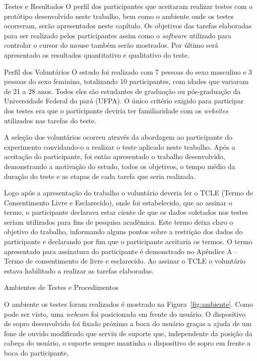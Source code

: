 \begin{chapter}{Testes e Resultados}
O perfil dos participantes que aceitaram realizar testes com o protótipo
desenvolvido neste trabalho, bem como o ambiente onde os testes ocorreram, serão
apresentados neste capítulo. Os objetivos das tarefas elaboradas para ser
realizado pelos participantes assim como o \textit{software} utilizado  para
controlar o cursor do mouse também serão mostrados. Por último será apresentado
os resultados quantitativo e qualitativo do teste.  

\begin{section}{Perfil dos Voluntários}
O estudo foi realizado com 7 pessoas do sexo masculino e 3 pessoas do sexo
feminino, totalizando 10 participantes, com idades que variaram de 21 a 28 anos.
Todos eles são estudantes de graduação ou pós-graduação da Universidade Federal
do pará (UFPA). O único critério exigido para participar dos testes era que o
participante deviria ter familiaridade com os \textit{websites} utilizados nas
tarefas do teste.  

A seleção dos voluntários ocorreu através da abordagem ao participante do
experimento convidando-o a realizar o teste aplicado neste trabalho. Após a
aceitação do participante, foi então apresentado o trabalho desenvolvido,
demonstrando a motivação do estudo, todos os objetivos, o tempo médio da duração
do teste e  as etapas de cada tarefa que seria realizada. 

Logo após a apresentação do trabalho o voluntário deveria ler o TCLE (Termo de
Consentimento Livre e Esclarecido), onde foi estabelecido, que ao assinar o
termo, o participante declarava estar ciente de que os dados coletados nos
testes seriam utilizados para fins de pesquisa acadêmica. Este termo deixa
claro o objetivo do trabalho, informando alguns pontos sobre a restrição dos
dados do participante e declarando por fim que o participante aceitaria os
termos. O termo apresentado para assinatura do participante é demonstrado no
Apêndice A – Termo de consentimento de livre e esclarecido. Ao assinar o TCLE o
voluntário estava habilitado a realizar as tarefas elaboradas. 
\end{section}

\begin{section}{Ambientes de Testes e Procedimentos}

O ambiente os testes foram realizados é mostrado na Figura~\ref{fig:ambiente}.
Como pode ser visto, uma \textit{webcam} foi posicionada em frente do usuário. O
dispositivo de sopro desenvolvido foi fixado próximo a boca do usuário graças a
ajuda de um fone de ouvido modificado que serviu de suporte que, independente da
posição da cabeça do usuário, o suporte sempre mantinha o dispositivo de sopro
em frente a boca do participante.


\end{section}
\end{chapter}
